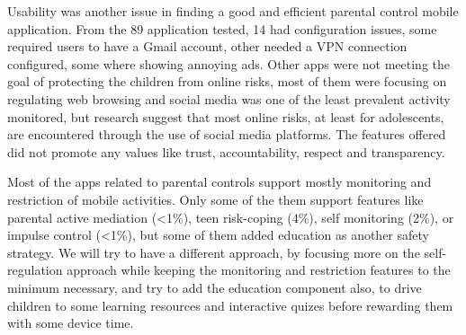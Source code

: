 Usability was another issue in finding a good and efficient parental control mobile application. From the 89 application tested, 14 had configuration issues, some required users to have a Gmail account, other needed a VPN connection configured, some where showing annoying ads. Other apps were not meeting the goal of protecting the children from online risks, most of them were focusing on regulating web browsing and social media was one of the least prevalent activity monitored, but research suggest that most online risks, at least for adolescents, are encountered through the use of social media platforms. The features offered did not promote any values like trust, accountability, respect and transparency.

Most of the apps related to parental controls support mostly monitoring and restriction of mobile activities. Only some of the them support features like parental active mediation (<1\%), teen risk-coping (4\%), self monitoring (2\%), or impulse control (<1\%), but some of them added education as another safety strategy. We will try to have a different approach, by focusing more on the self-regulation approach while keeping the monitoring and restriction features to the minimum necessary, and try to add the education component also, to drive children to some learning resources and interactive quizes before rewarding them with some device time.

